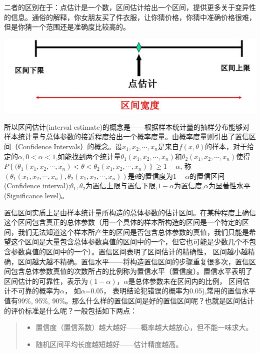 \documentclass[]{ctexbook}
\providecommand{\tightlist}{%
  \setlength{\itemsep}{0pt}\setlength{\parskip}{0pt}}
\begin{document}
二者的区别在于：点估计是一个数，区间估计给出一个区间，提供更多关于变异性的信息。通俗的解释，你女朋友买了件衣服，让你猜价格，你猜中准确价格很难，但是你猜一个范围还是准确度比较高的。

\includegraphics[width=1\linewidth,height=0.3\textheight]{fig/fig8}

所以区间估计(interval estimate)的概念是------根据样本统计量的抽样分布能够对样本统计量与总体参数的接近程度给出一个概率度量。由概率度量则引出了置信区间（Confidence Intervals）的概念。设\(x_1,x_2,\cdots,x_n\)是来自\(f(x,\theta)\)的样本，对于给定的\(\alpha,0<\alpha<1\),如能找到两个统计量\(\theta_1(x_1,x_2,\cdots,x_n)\)和\(\theta_2(x_1,x_2,\cdots,x_n)\)使得\(P\left\{(\theta_1(x_1,x_2,\cdots,x_n)<\theta<\theta_2(x_1,x_2,\cdots,x_n)\right\}\ge1-\alpha\), 称\((\theta_1(x_1,x_2,\cdots,x_n),\theta_2(x_1,x_2,\cdots,x_n))\)是\(\theta\)的置信度为\(1-\alpha\)的置信区间(Confidence interval);\(\theta_1,\theta_2\)为置信上限与置信下限,\(1-\alpha\)为置信度,\(\alpha\)为显著性水平(Significance level)。

置信区间实质上是由样本统计量所构造的总体参数的估计区间。在某种程度上确信这个区间包含真正的总体参数（用一个具体的样本所构造的区间是一个特定的区间，我们无法知道这个样本所产生的区间是否包含总体参数的真值，我们只能是希望这个区间是大量包含总体参数真值的区间中的一个，但它也可能是少数几个不包含参数真值的区间中的一个）。置信区间表明了区间估计的精确性， 区间越小越精确，区间越大越不精确。置信水平------将构造置信区间的步骤重复很多次，置信区间包含总体参数真值的次数所占的比例称为置信水平（置信度）。置信水平表明了区间估计的可靠性，表示为\((1-\alpha)\)，\(\alpha\)是总体参数未在区间内的比例， 区间估计不可靠的概率为\(\alpha\)， 如\(\alpha\)=0.05， 表明结论犯错误的概率为0.05),常用的置信水平值有99\%, 95\%, 90\%。那么什么样的置信区间是好的置信区间呢？也就是区间估计的评价标准是什么呢？一般包括如下两点：

\begin{quote}
\begin{itemize}
\tightlist
\item
  置信度（置信系数）越大越好------概率越大越放心，但不能一味求大。
\item
  随机区间平均长度越短越好------估计精度越高。
\end{itemize}
\end{quote}
\end{document}
